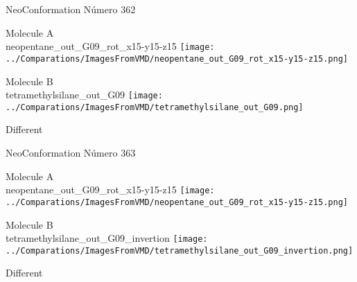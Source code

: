  \newpage

\vtab[-2cm]
\begin{center}
{\large NeoConformation \tab Número 362}
\end{center}
\begin{multicols}{2}
\begin{center}
Molecule A \\ 
neopentane\_out\_G09\_rot\_x15-y15-z15
\texttt{[image: ../Comparations/ImagesFromVMD/neopentane\_out\_G09\_rot\_x15-y15-z15.png]}
\\
\vtab

\columnbreak
Molecule B \\ 
tetramethylsilane\_out\_G09
\texttt{[image: ../Comparations/ImagesFromVMD/tetramethylsilane\_out\_G09.png]}
\\
\vtab


\end{center}
\end{multicols}
\begin{center}
\vtab
\vtab
\textcolor{NavyBlue}{\Large Different}
\end{center}

 \newpage

\vtab[-2cm]
\begin{center}
{\large NeoConformation \tab Número 363}
\end{center}
\begin{multicols}{2}
\begin{center}
Molecule A \\ 
neopentane\_out\_G09\_rot\_x15-y15-z15
\texttt{[image: ../Comparations/ImagesFromVMD/neopentane\_out\_G09\_rot\_x15-y15-z15.png]}
\\
\vtab

\columnbreak
Molecule B \\ 
tetramethylsilane\_out\_G09\_invertion
\texttt{[image: ../Comparations/ImagesFromVMD/tetramethylsilane\_out\_G09\_invertion.png]}
\\
\vtab


\end{center}
\end{multicols}
\begin{center}
\vtab
\vtab
\textcolor{NavyBlue}{\Large Different}
\end{center}

 \newpage

